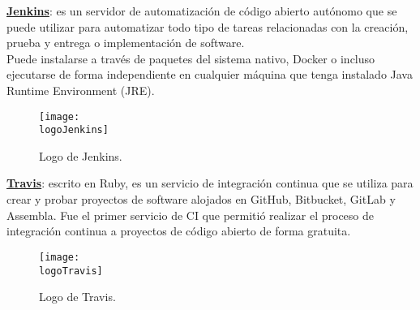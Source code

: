 \begin{compactitem}
    \item \textbf{\underline{Jenkins}}: es un servidor de automatización de código abierto autónomo que se puede utilizar para automatizar todo tipo de tareas relacionadas con la creación, prueba y entrega o implementación de software.\\
    Puede instalarse a través de paquetes del sistema nativo, Docker o incluso ejecutarse de forma independiente en cualquier máquina que tenga instalado Java Runtime Environment (JRE).
    \begin{figure}[h]
        \centering
        \texttt{[image: \\logoJenkins]}
        \caption{Logo de Jenkins.}
    \end{figure}
    \item \textbf{\underline{Travis}}: escrito en Ruby, es un servicio de integración continua que se utiliza para crear y probar proyectos de software alojados en GitHub, Bitbucket, GitLab y Assembla. Fue el primer servicio de CI que permitió realizar el proceso de integración continua a proyectos de código abierto de forma gratuita.
    
    \begin{figure}[h]
        \centering
        \texttt{[image: \\logoTravis]}
        \caption{Logo de Travis.}
    \end{figure}
    

\end{compactitem}
